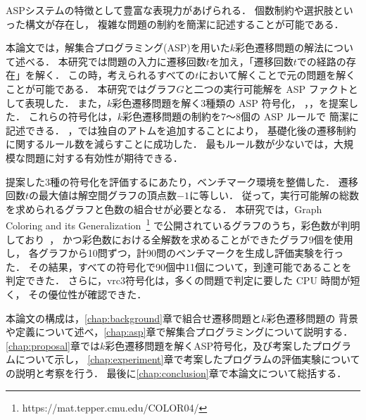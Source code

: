 ASPシステムの特徴として豊富な表現力があげられる．
個数制約や選択肢といった構文が存在し，
複雑な問題の制約を簡潔に記述することが可能である．

本論文では，解集合プログラミング(ASP)を用いた$k$彩色遷移問題の解法について述べる．
本研究では問題の入力に遷移回数$t$を加え，「遷移回数$t$での経路の存在」を解く．
この時，考えられるすべての$t$において解くことで元の問題を解くことが可能である．
本研究ではグラフ$G$と二つの実行可能解を ASP ファクトとして表現した．
また，$k$彩色遷移問題を解く3種類の ASP 符号化，
，，を提案した．
これらの符号化は，$k$彩色遷移問題の制約を7〜8個の ASP ルールで
簡潔に記述できる．
，では独自のアトムを追加することにより，
基礎化後の遷移制約に関するルール数を減らすことに成功した．
最もルール数が少ないでは，大規模な問題に対する有効性が期待できる．

提案した3種の符号化を評価するにあたり，ベンチマーク環境を整備した．
遷移回数$t$の最大値は解空間グラフの頂点数$-1$に等しい．
従って，実行可能解の総数を求められるグラフと色数の組合せが必要となる．
本研究では，Graph Coloring and its Generalization~\footnote{https://mat.tepper.cmu.edu/COLOR04/}
で公開されているグラフのうち，彩色数が判明しており~\cite{DBLP:journals/constraints/TamuraTKB09}，
かつ彩色数における全解数を求めることができたグラフ9個を使用し，
各グラフから10問ずつ，計90問のベンチマークを生成し評価実験を行った．
その結果，すべての符号化で90個中11個について，到達可能であることを判定できた．
さらに，\textsf{vrc3}符号化は，多くの問題で判定に要した CPU 時間が短く，
その優位性が確認できた．

本論文の構成は，\ref{chap:background}章で組合せ遷移問題と$k$彩色遷移問題の
背景や定義について述べ，\ref{chap:asp}章で解集合プログラミングについて説明する．
\ref{chap:proposal}章では$k$彩色遷移問題を解くASP符号化，及び考案したプログラムについて示し，
\ref{chap:experiment}章で考案したプログラムの評価実験についての説明と考察を行う．
最後に\ref{chap:conclusion}章で本論文について総括する．


